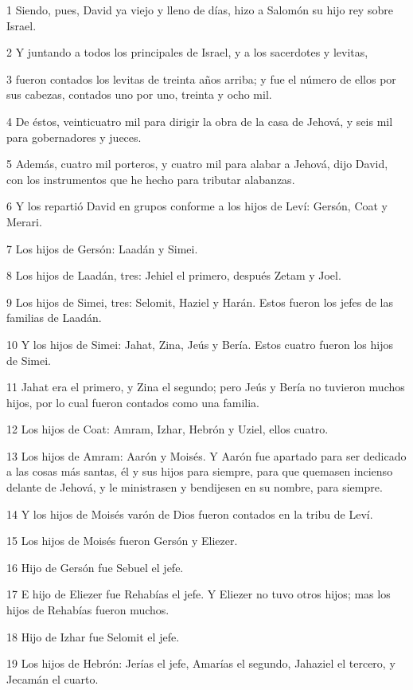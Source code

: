\par 1 Siendo, pues, David ya viejo y lleno de días, hizo a Salomón su hijo rey sobre Israel. 
\par 2 Y juntando a todos los principales de Israel, y a los sacerdotes y levitas,
\par 3 fueron contados los levitas de treinta años arriba; y fue el número de ellos por sus cabezas, contados uno por uno, treinta y ocho mil.
\par 4 De éstos, veinticuatro mil para dirigir la obra de la casa de Jehová, y seis mil para gobernadores y jueces.
\par 5 Además, cuatro mil porteros, y cuatro mil para alabar a Jehová, dijo David, con los instrumentos que he hecho para tributar alabanzas.
\par 6 Y los repartió David en grupos conforme a los hijos de Leví: Gersón, Coat y Merari.
\par 7 Los hijos de Gersón: Laadán y Simei.
\par 8 Los hijos de Laadán, tres: Jehiel el primero, después Zetam y Joel.
\par 9 Los hijos de Simei, tres: Selomit, Haziel y Harán. Estos fueron los jefes de las familias de Laadán.
\par 10 Y los hijos de Simei: Jahat, Zina, Jeús y Bería. Estos cuatro fueron los hijos de Simei.
\par 11 Jahat era el primero, y Zina el segundo; pero Jeús y Bería no tuvieron muchos hijos, por lo cual fueron contados como una familia.
\par 12 Los hijos de Coat: Amram, Izhar, Hebrón y Uziel, ellos cuatro.
\par 13 Los hijos de Amram: Aarón y Moisés. Y Aarón fue apartado para ser dedicado a las cosas más santas, él y sus hijos para siempre, para que quemasen incienso delante de Jehová, y le ministrasen y bendijesen en su nombre, para siempre. 
\par 14 Y los hijos de Moisés varón de Dios fueron contados en la tribu de Leví.
\par 15 Los hijos de Moisés fueron Gersón y Eliezer.
\par 16 Hijo de Gersón fue Sebuel el jefe.
\par 17 E hijo de Eliezer fue Rehabías el jefe. Y Eliezer no tuvo otros hijos; mas los hijos de Rehabías fueron muchos.
\par 18 Hijo de Izhar fue Selomit el jefe.
\par 19 Los hijos de Hebrón: Jerías el jefe, Amarías el segundo, Jahaziel el tercero, y Jecamán el cuarto.

